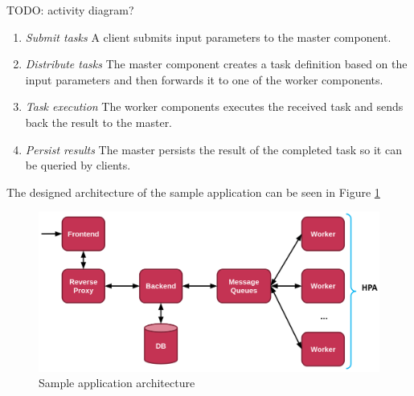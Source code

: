 TODO: activity diagram?

\begin{enumerate}
	\item \emph{Submit tasks } A client submits input parameters to the master component.
	\item \emph{Distribute tasks} The master component creates a task definition based on the input parameters and then forwards it to one of the worker components.
	\item \emph{Task execution} The worker components executes the received task and sends back the result to the master.
	\item \emph{Persist results} The master persists the result of the completed task so it can be queried by clients.
\end{enumerate}

The designed architecture of the sample application can be seen in Figure \ref{fig:sample_app_arch}

\begin{figure}[h]
	\centering
	\includegraphics[width=130mm, keepaspectratio]{figures/sample_app_arch.png}
	\caption{Sample application architecture}
	\label{fig:sample_app_arch}
\end{figure}
%
%


